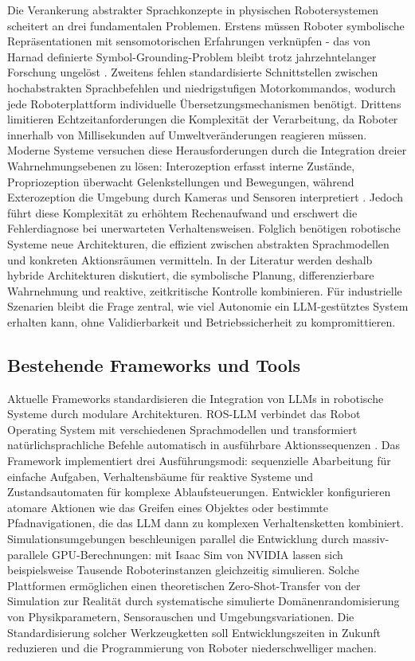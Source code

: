 Die Verankerung abstrakter Sprachkonzepte in physischen Robotersystemen
scheitert an drei fundamentalen Problemen. Erstens müssen Roboter symbolische
Repräsentationen mit sensomotorischen Erfahrungen verknüpfen - das von Harnad
definierte Symbol-Grounding-Problem bleibt trotz jahrzehntelanger Forschung
ungelöst . Zweitens fehlen standardisierte
Schnittstellen zwischen hochabstrakten Sprachbefehlen und niedrigstufigen
Motorkommandos, wodurch jede Roboterplattform individuelle
Übersetzungsmechanismen benötigt. Drittens limitieren Echtzeitanforderungen die
Komplexität der Verarbeitung, da Roboter innerhalb von Millisekunden auf
Umweltveränderungen reagieren müssen. Moderne Systeme versuchen diese
Herausforderungen durch die Integration dreier Wahrnehmungsebenen zu lösen:
Interozeption erfasst interne Zustände, Propriozeption überwacht
Gelenkstellungen und Bewegungen, während Exterozeption die Umgebung durch
Kameras und Sensoren interpretiert . Jedoch führt
diese Komplexität zu erhöhtem Rechenaufwand und erschwert die Fehlerdiagnose bei
unerwarteten Verhaltensweisen. Folglich benötigen robotische Systeme neue
Architekturen, die effizient zwischen abstrakten Sprachmodellen und konkreten
Aktionsräumen vermitteln. In der Literatur werden deshalb hybride Architekturen
diskutiert, die symbolische Planung, differenzierbare Wahrnehmung und reaktive,
zeitkritische Kontrolle kombinieren. Für industrielle Szenarien bleibt die Frage
zentral, wie viel Autonomie ein LLM-gestütztes System erhalten kann, ohne
Validierbarkeit und Betriebssicherheit zu kompromittieren.

\subsection{Bestehende Frameworks und Tools}

Aktuelle Frameworks standardisieren die Integration von LLMs in robotische
Systeme durch modulare Architekturen. ROS-LLM verbindet das Robot Operating
System mit verschiedenen Sprachmodellen und transformiert natürlichsprachliche
Befehle automatisch in ausführbare Aktionssequenzen .
Das Framework implementiert drei Ausführungsmodi: sequenzielle Abarbeitung für
einfache Aufgaben, Verhaltensbäume für reaktive Systeme und Zustandsautomaten
für komplexe Ablaufsteuerungen. Entwickler konfigurieren atomare Aktionen wie
das Greifen eines Objektes oder bestimmte Pfadnavigationen, die das LLM dann zu
komplexen Verhaltensketten kombiniert. Simulationsumgebungen beschleunigen
parallel die Entwicklung durch massiv-parallele GPU-Berechnungen: mit Isaac Sim
von NVIDIA lassen sich beispielsweise Tausende Roboterinstanzen gleichzeitig
simulieren. Solche Plattformen
ermöglichen einen theoretischen
Zero-Shot-Transfer von der Simulation zur Realität durch systematische
simulierte Domänenrandomisierung von Physikparametern, Sensorauschen und
Umgebungsvariationen. Die Standardisierung solcher
Werkzeugketten soll Entwicklungszeiten in Zukunft reduzieren und die
Programmierung von
Roboter niederschwelliger machen.

